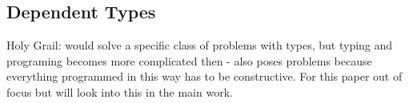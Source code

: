 \subsection{Dependent Types}
Holy Grail: would solve a specific class of problems with types, but typing and programing becomes more complicated then - also poses problems because everything programmed in this way has to be constructive. For this paper out of focus but will look into this in the main work.